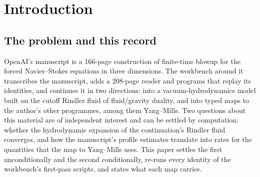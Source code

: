 \begin{abstract}
\noindent
OpenAI's manuscript \emph{Finite Time Blowup for Navier--Stokes} constructs, for every viscosity, a smooth solution of the forced three-dimensional Navier--Stokes equations with bounded energy that blows up in finite time. A workbench built by KokunoYumeto with AI systems reconstructs the construction, continues it into a vacuum-hydrodynamics model, and connects it to Yang--Mills and other programmes. This paper states what the workbench establishes and proves three kinds of results.

First, for the shear sector of the cutoff Rindler fluid of the continuation, the hydrodynamic dispersion series $\omega(k)=-i\nu k^2-i(3\nu^3/2c^2)k^4-\cdots$ has radius of convergence exactly $k_*=0.389236400495165\ldots\,c/\nu$. The radius is set by a certified collision of the diffusive pole with the first non-hydrodynamic pole at purely imaginary frequency; the mode is purely damped up to it, the coefficients have exact square-root asymptotics, and the series summed on its circle of convergence returns the collision frequency. These statements are proved with computer assistance in ball arithmetic and verified independently with a second interval library. Second, conditionally on four named statements of the manuscript, the curvature masses of the workbench's map from Navier--Stokes to Yang--Mills grow at explicit rates. Third, under the same statements the blowup is of Type II, with $\|u\|_{L^3}\gtrsim\tau^{-4h/3}$, and every rate is compared with the classical necessary conditions for a singularity. The manuscript's main theorem is imported and is not verified here.
\end{abstract}

\section*{Introduction}\label{sec:about}

\subsection*{The problem and this record}

OpenAI's manuscript \cite{OpenAINS} is a 166-page construction of finite-time blowup for the forced Navier--Stokes equations in three dimensions. The workbench around it transcribes the manuscript, adds a 208-page reader and programs that replay its identities, and continues it in two directions: into a vacuum-hydrodynamics model built on the cutoff Rindler fluid of fluid/gravity duality, and into typed maps to the author's other programmes, among them Yang--Mills. Two questions about this material are of independent interest and can be settled by computation: whether the hydrodynamic expansion of the continuation's Rindler fluid converges, and how the manuscript's profile estimates translate into rates for the quantities that the map to Yang--Mills uses. This paper settles the first unconditionally and the second conditionally, re-runs every identity of the workbench's first-pass scripts, and states what each map carries.

